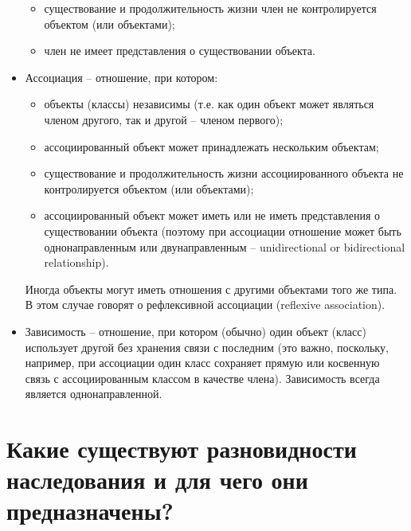 \documentclass[a4paper,12pt]{article}	%
\begin{document}
\begin{itemize}
\begin{itemize}
			\item существование и продолжительность жизни член не контролируется объектом (или объектами);
			
			\item член не имеет представления о существовании объекта.
		
		\end{itemize}
		
		\item Ассоциация -- отношение, при котором:
	
		\begin{itemize}
			
			\item объекты (классы) независимы (т.е. как один объект может являться членом другого, так и другой -- членом первого);
			
			\item ассоциированный объект может принадлежать нескольким объектам;
			
			\item существование и продолжительность жизни ассоциированного объекта не контролируется объектом (или объектами);
			
			\item ассоциированный объект может иметь или не иметь представления о существовании объекта (поэтому при ассоциации отношение может быть однонаправленным или двунаправленным -- unidirectional or bidirectional relationship).
		
		\end{itemize}
		
		Иногда объекты могут иметь отношения с другими объектами того же типа. В этом случае говорят о рефлексивной ассоциации (reflexive association).
		
		\item Зависимость -- отношение, при котором (обычно) один объект (класс) использует другой без хранения связи с последним (это важно, поскольку, например, при ассоциации один класс сохраняет прямую или косвенную связь с ассоциированным классом в качестве члена). Зависимость всегда является однонаправленной.		
				
	\end{itemize}

\newpage

\section{Какие существуют разновидности наследования и для чего они предназначены?}
	
\end{document}
